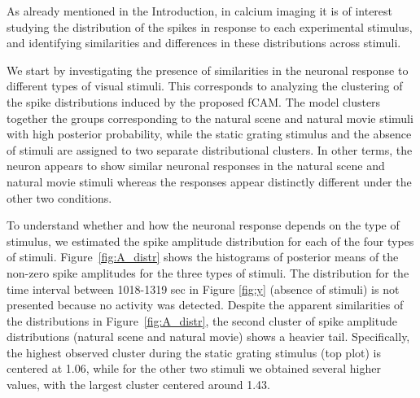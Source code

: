 %
As already mentioned in the Introduction, in calcium imaging it is of interest studying the distribution of the spikes in response to each experimental stimulus, and identifying similarities and differences in these distributions across stimuli. 

We start by investigating the presence of similarities in the neuronal response to different types of visual stimuli. This corresponds to analyzing the clustering of the spike distributions induced by the proposed fCAM. The model clusters together the groups corresponding to the natural scene and natural movie stimuli with high posterior probability, while the static grating stimulus and the absence of stimuli are assigned to two separate distributional clusters. In other terms, the neuron appears to show similar neuronal responses in the natural scene and natural movie stimuli whereas the responses appear distinctly different under the other two conditions. 



To understand whether and how the neuronal response depends on the type of stimulus, we estimated the spike amplitude distribution for each of the four types of stimuli. Figure~\ref{fig:A_distr} shows the histograms of posterior means of the non-zero spike amplitudes for the three types of stimuli. The distribution for the time interval between 1018-1319 sec in Figure \ref{fig:y} (absence of stimuli) is not presented because no activity was detected. Despite the apparent similarities of the distributions in Figure~\ref{fig:A_distr}, the second cluster of spike amplitude distributions (natural scene and natural movie) shows a heavier tail. 
Specifically, the highest observed cluster during the static grating stimulus (top plot) is centered at 1.06, while for the other two stimuli we obtained several higher values, with the largest cluster centered around 1.43. 



